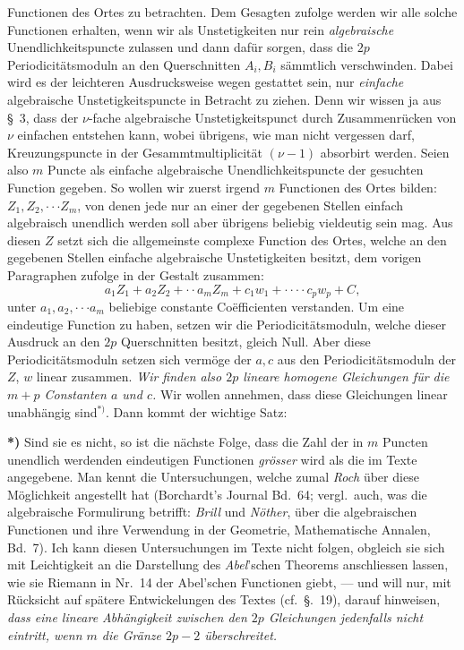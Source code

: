 \documentclass{article}
\begin{document}
Functionen des Ortes zu betrachten. Dem Gesagten zufolge werden wir alle solche Functionen erhalten, wenn wir als Unstetigkeiten nur rein \emph{algebraische} Unendlichkeitspuncte zulassen und dann dafür sorgen, dass die $2p$ Periodicitätsmoduln an den Querschnitten $A_{i}, B_{i}$ sämmtlich verschwinden. Dabei wird es der leichteren Ausdrucksweise wegen gestattet sein, nur \emph{einfache} algebraische Unstetigkeitspuncte in Betracht zu ziehen. Denn wir wissen ja aus §~3, dass der $\nu$-fache algebraische Unstetigkeitspunct durch Zusammenrücken von $\nu$ einfachen entstehen kann, wobei übrigens, wie man nicht vergessen darf, Kreuzungspuncte in der Gesammtmultiplicität $(\nu - 1)$ absorbirt werden. Seien also $m$ Puncte als einfache algebraische Unendlichkeitspuncte der gesuchten Function gegeben. So wollen wir zuerst irgend $m$ Functionen des Ortes bilden: $Z_{1}, Z_{2}, \cdot\cdot\cdot Z_{m}$, von denen jede nur an einer der gegebenen Stellen einfach algebraisch unendlich werden soll aber übrigens beliebig vieldeutig sein mag. Aus diesen $Z$ setzt sich die allgemeinste complexe Function des Ortes, welche an den gegebenen Stellen einfache algebraische Unstetigkeiten besitzt, dem vorigen Paragraphen zufolge in der Gestalt zusammen:
\[ a_{1}Z_{1} + a_{2}Z_{2} + \cdot\cdot a_{m}Z_{m} + c_{1}w_{1} + \cdot\cdot\cdot\cdot c_{p}w_{p} + C, \]
unter $a_{1}, a_{2}, \cdot\cdot\cdot a_{m}$ beliebige constante Coëfficienten verstanden. Um eine eindeutige Function zu haben, setzen wir die Periodicitätsmoduln, welche dieser Ausdruck an den $2p$ Querschnitten besitzt, gleich Null. Aber diese Periodicitätsmoduln setzen sich vermöge der $a, c$ aus den Periodicitätsmoduln der $Z$, $w$ linear zusammen. \emph{Wir finden also $2p$ lineare homogene Gleichungen für die $m + p$ Constanten $a$ und $c$.} Wir wollen annehmen, dass diese Gleichungen linear unabhängig sind${}^{*)}$. Dann kommt der wichtige Satz:

\textbf{*)} Sind sie es nicht, so ist die nächste Folge, dass die Zahl der in $m$ Puncten unendlich werdenden eindeutigen Functionen \emph{grösser} wird als die im Texte angegebene. Man kennt die Untersuchungen, welche zumal \emph{Roch} über diese Möglichkeit angestellt hat (Borchardt's Journal Bd.~64; vergl.\ auch, was die algebraische Formulirung betrifft: \emph{Brill} und \emph{Nöther}, über die algebraischen Functionen und ihre Verwendung in der Geometrie, Mathematische Annalen, Bd.~7). Ich kann diesen Untersuchungen im Texte nicht folgen, obgleich sie sich mit Leichtigkeit an die Darstellung des \emph{Abel}'schen Theorems anschliessen lassen, wie sie Riemann in Nr.~14 der Abel'schen Functionen giebt, --- und will nur, mit Rücksicht auf spätere Entwickelungen des Textes (cf.\ §.~19), darauf hinweisen, \emph{dass eine lineare Abhängigkeit zwischen den $2p$ Gleichungen jedenfalls nicht eintritt, wenn $m$ die Gränze $2p - 2$ überschreitet.}
\end{document}
